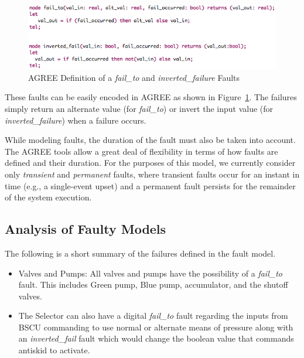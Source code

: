 \begin{figure}[h!]
  \centering
 \includegraphics[width=1\textwidth]{images/failureNodes.png}
  \vspace{-0.1in}
  \caption{AGREE Definition of a \textit{fail\_to} and \textit{inverted\_failure} Faults}
  \label{fig:failureNodes}
\end{figure}

These faults can be easily encoded in AGREE as shown in Figure~\ref{fig:failureNodes}.  The failures simply return an alternate value (for {\em fail\_to}) or invert the input value (for {\em inverted\_failure}) when a failure occurs.
 

While modeling faults, the duration of the fault must also be taken into account.  The AGREE tools allow a great deal of flexibility in terms of how faults are defined and their duration.  For the purposes of this model, we currently consider only {\em transient} and {\em permanent} faults, where transient faults occur for an instant in time (e.g., a single-event upset) and a permanent fault persists for the remainder of the system execution.


\subsection{Analysis of Faulty Models}
The following is a short summary of the failures defined in the fault model.

\begin{itemize}

\item Valves and Pumps: All valves and pumps have the possibility of a \textit{fail\_to} fault. This includes Green pump, Blue pump, accumulator, and the shutoff valves.

\item  The Selector can also have a digital \textit{fail\_to} fault regarding the inputs from BSCU commanding to use normal or alternate means of pressure along with an \textit{inverted\_fail} fault which would change the boolean value that commands antiskid to activate.

\end{itemize}

